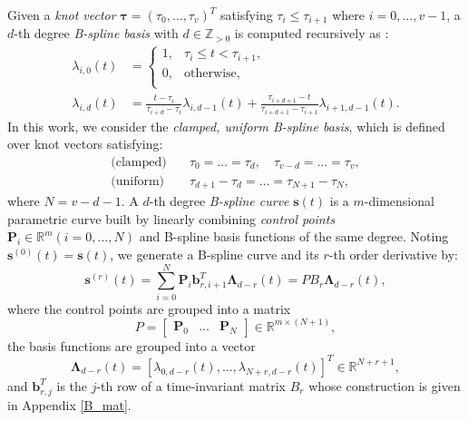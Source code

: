 \documentclass[journal,10pt]{IEEEtran}
\newtheorem{definition}{\bfseries Definition}%
\newcommand{\vect}[1]{\boldsymbol{\mathbf{#1}}}
\newcommand{\mat}[1]{\begin{bmatrix} #1 \end{bmatrix}}
\newcommand{\R}{\mathbb{R}}
\newcommand{\Z}{\mathbb{Z}}
\newif\ifdraft
\newcommand{\VF}[1]{\ifdraft{\color{blue}[{\bf VF}: #1]}\fi}
\begin{document}
Given a \emph{knot vector} $\vect{\tau} = (\tau_0, \ldots,\tau_v)^T$ satisfying $\tau_i \leq \tau_{i+1}$ where $i=0,\ldots,v-1$, a $d$-th degree \emph{B-spline basis} with  $d\in\Z_{> 0}$ is computed recursively as \cite{deboor}:
\begin{align*}
    \lambda_{i,0}(t) &= \begin{cases} 
      1, & \tau_i \leq t <\tau_{i+1}, \\
      0, & \text{otherwise}, \\
   \end{cases}\\
   \lambda_{i,d}(t)&=\frac{t-\tau_i}{\tau_{i+d}-\tau_i}\lambda_{i,d-1}(t)+ \frac{\tau_{i+d+1}-t}{\tau_{i+d+1}-\tau_{i+1}}\lambda_{i+1,d-1}(t).
\end{align*}
In this work, we consider the \emph{clamped, uniform B-spline basis}, which is defined over knot vectors satisfying:
\begin{subequations} \label{clamped_uniform}
\begin{align}
    \text{(clamped)} \quad &\tau_0=\ldots=\tau_d, \quad \tau_{v-d}=\ldots=\tau_{v},\label{clamped}\\
    \text{(uniform)}\quad &\tau_{d+1}-\tau_{d}=\ldots =\tau_{N+1}-\tau_{N},\label{uniform}
\end{align}
\end{subequations}
where $N = v-d-1$. A $d$-th degree \emph{B-spline curve} $\vect{s}(t)$ is a $m$-dimensional parametric curve  built by linearly combining \emph{control points} $\vect{P}_i\in\mathbb{R}^m (i=0,\ldots,N)$ and B-spline basis functions of the same degree. Noting $\vect{s}^{(0)}(t) = \vect{s}(t)$, we generate a B-spline curve and its $r$-th order derivative by:
\begin{equation}
    \vect{s}^{(r)}(t) = \sum_{i=0}^{N}\vect{P}_i\vect{b}_{r,i+1}^T\vect{\Lambda}_{d-r}(t) = PB_r\vect{\Lambda}_{d-r}(t),
    \label{b-spline_curve}
\end{equation}
where the control points are grouped into a matrix
\begin{equation} \label{defP}
    P = \mat{\vect{P}_0&\dots& \vect{P}_N} \in\R^{m\times (N+1)},
\end{equation}
the basis functions are grouped into a vector
\begin{equation}
    \vect{\Lambda}_{d-r}(t) = \left[\lambda_{0,d-r}(t),\dots ,\lambda_{N+r,d-r}(t)\right]^T\in\R^{N+r+1},
\end{equation}
and $\vect{b}_{r,j}^T$ is the $j$-th row of a time-invariant matrix $B_{r}$ whose construction is given in Appendix \ref{B_mat}. %
\end{document}
